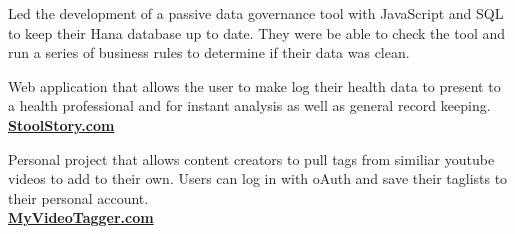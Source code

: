 \documentclass[]{deedy-resume-openfont}
\begin{document}
\begin{minipage}[t]{0.66\textwidth}
Led the development of a passive data governance tool with JavaScript and SQL to keep their Hana database up to date.  They were be able to check the tool and run a series of business rules to determine if their data was clean.
\sectionsep

Web application that allows the user to make log their health data to present to a health professional and for instant analysis as well as general record keeping. \\
\href{https://stoolstory.com}{\bf StoolStory.com}
\sectionsep


\href{https://myvideotagger.com}{}
Personal project that allows content creators to pull tags from similiar youtube videos to add to their own.  Users can log in with  oAuth and save their taglists to their personal account. \\
\href{https://myvideotagger.com}{\bf MyVideoTagger.com}
\sectionsep

\end{minipage} 
\end{document}
